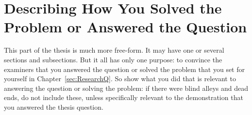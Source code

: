 \chapter{Describing How You Solved the Problem or Answered the Question}

This part of the thesis is much more free-form. It may have one or several
sections and subsections. But it all has only one purpose: to convince the
examiners that you answered the question or solved the problem that you
set for yourself in Chapter~\ref{sec:ResearchQ}. So show what you did that is relevant to answering the question or solving the problem: if there were blind alleys and dead ends, do not include these, unless specifically relevant to the
demonstration that you answered the thesis question.
